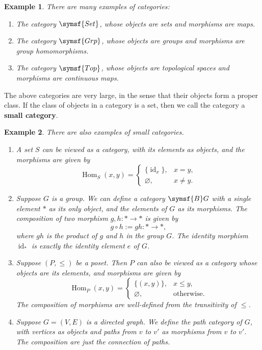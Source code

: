 \documentclass{article}
\theoremstyle{theorem}
\newtheorem{example}{Example}[section]
\theoremstyle{remark}
\DeclareMathOperator{\Hom}{Hom}
\DeclareMathOperator{\id}{id}
\begin{document}
\begin{example}
    There are many examples of categories:
    \begin{enumerate}
        \item The category $\symsf{Set}$, whose objects are sets and morphisms are maps.
        \item The category $\symsf{Grp}$, whose objects are groups and morphisms are group homomorphisms.
        \item The category $\symsf{Top}$, whose objects are topological spaces and morphisms are continuous maps.
    \end{enumerate}
\end{example}

The above categories are very large, in the sense that their objects form a proper class. If the class of objects in a category is a set, then we call the category a \textbf{small category}. 

\begin{example}
    There are also examples of small categories. 
    \begin{enumerate}
        \item A set $S$ can be viewed as a category, with its elements as objects, and the morphisms are given by $$\Hom_S(x, y) = \begin{cases} \{\id_x\}, & x = y, \\ \varnothing, & x \neq y. \end{cases}$$
        \item Suppose $G$ is a group. We can define a category $\symsf{B}G$ with a single element $\ast$ as its only object, and the elements of $G$ as its morphisms. The composition of two morphism $g, h : \ast \to \ast$ is given by $$g \circ h := gh : \ast \to \ast,$$ where $gh$ is the product of $g$ and $h$ in the group $G$. The identity morphism $\id_\ast$ is exactly the identity element $e$ of $G$. 
        \item Suppose $(P, \leq)$ be a poset. Then $P$ can also be viewed as a category whose objects are its elements, and morphisms are given by $$\Hom_P(x, y) = \begin{cases} \{(x, y)\}, & x \leq y, \\ \varnothing, & \text{otherwise}. \end{cases}$$ The composition of morphisms are well-defined from the transitivity of $\leq$. 
        \item Suppose $G = (V, E)$ is a directed graph. We define the path category of $G$, with vertices as objects and paths from $v$ to $v'$ as morphisms from $v$ to $v'$. The composition are just the connection of paths. 
    \end{enumerate}
\end{example}
\end{document}
